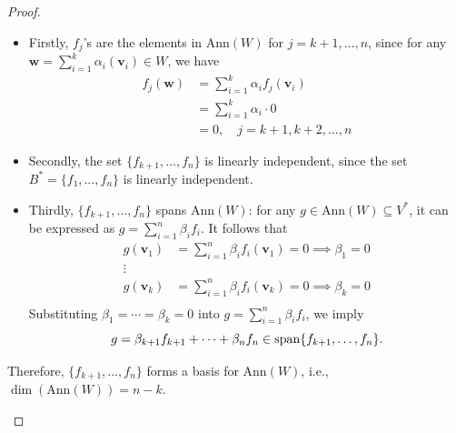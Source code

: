 \begin{proof}
\begin{enumerate}
\begin{itemize}
\item
Firstly, $f_j$'s are the elements in $\text{Ann}(W)$ for $j=k+1,\dots,n$, since for any $\bm w=\sum_{i=1}^k\alpha_i(\bm v_i)\in W$, we have
\begin{align*}
f_{j}(\bm w)&=\sum_{i=1}^k\alpha_if_j(\bm v_i)\\
&=\sum_{i=1}^k\alpha_i\cdot0\\
&=0,\quad j=k+1,k+2,\dots,n
\end{align*}
\item
Secondly, the set $\{f_{k+1},\dots,f_n\}$ is linearly independent, since the set $B^*=\{f_{1},\dots,f_n\}$ is linearly independent.
\item
Thirdly, $\{f_{k+1},\dots,f_n\}$ spans $\text{Ann}(W)$: for any $g\in\text{Ann}(W)\subseteq V^*$, it can be expressed as $g=\sum_{i=1}^n\beta_if_i$. It follows that
\begin{align*}
g(\bm v_1)&=\sum_{i=1}^n\beta_if_i(\bm v_1)=0\implies\beta_1=0\\
\vdots\\
g(\bm v_k)&=\sum_{i=1}^n\beta_if_i(\bm v_k)=0\implies\beta_k=0\\
\end{align*}
Substituting $\beta_1=\cdots=\beta_k=0$ into $g=\sum_{i=1}^n\beta_if_i$, we imply 
\[
g = \beta_{k+1}f_{k+1}+\cdots+\beta_nf_n\in\operatorname{span}\{f_{k+1},\dots,f_n\}.
\]
\end{itemize}
Therefore, $\{f_{k+1},\dots,f_n\}$ forms a basis for $\text{Ann}(W)$, i.e., $\dim(\text{Ann}(W)) = n-k$.
\end{enumerate}
\end{proof}

